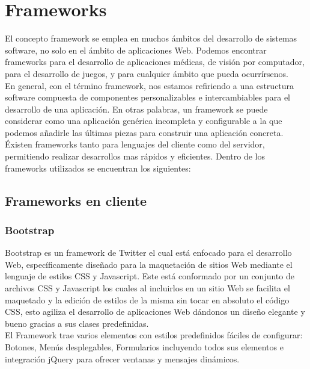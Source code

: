 \section{Frameworks}

El concepto framework se emplea en muchos \'ambitos del desarrollo de sistemas software, no solo en el \'ambito de aplicaciones Web. Podemos encontrar frameworks para el desarrollo de aplicaciones m\'edicas, de visi\'on por computador, para el desarrollo de juegos, y para cualquier \'ambito que pueda ocurr\'irsenos.\\

En general, con el t\'ermino framework, nos estamos refiriendo a una estructura software compuesta de componentes personalizables e intercambiables para el desarrollo de una aplicaci\'on. En otras palabras, un framework se puede considerar como una aplicaci\'on gen\'erica incompleta y configurable a la que podemos a\~nadirle las \'ultimas piezas para construir una aplicaci\'on concreta.\\

\'Existen frameworks tanto para lenguajes del cliente como del servidor, permitiendo realizar desarrollos mas rápidos y eficientes. Dentro de los frameworks utilizados se encuentran los siguientes:




\subsection{Frameworks en cliente}

	\subsubsection{Bootstrap}

		Bootstrap es un framework de Twitter el cual est\'a enfocado para el desarrollo Web, espec\'ificamente dise\~nado para la maquetaci\'on de sitios Web mediante  el lenguaje de estilos CSS y Javascript. Este est\'a conformado por un conjunto de archivos CSS y Javascript los cuales al incluirlos en un sitio Web se facilita el maquetado y la edici\'on de estilos de la misma sin tocar en absoluto el c\'odigo CSS, esto agiliza el desarrollo de aplicaciones Web d\'andonos un dise\~no elegante y bueno gracias a sus clases predefinidas.\\

		El Framework trae varios elementos con estilos predefinidos f\'aciles de configurar: Botones, Men\'us desplegables, Formularios incluyendo todos sus elementos e integraci\'on jQuery para ofrecer ventanas y mensajes din\'amicos.\\

